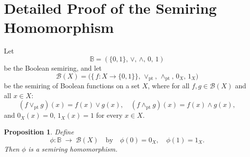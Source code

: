 \documentclass{article}
\newtheorem{proposition}{Proposition}
\begin{document}
\section*{Detailed Proof of the Semiring Homomorphism}

Let
\[
  \mathbb{B} = (\{0,1\},\,\vee,\,\wedge,\,0,\,1)
\]
be the Boolean semiring, and let
\[
  \mathcal{B}(X) = \bigl(\{\,f:X\to\{0,1\}\},\,\vee_{\mathrm{pt}},\,\wedge_{\mathrm{pt}},\,0_X,\,1_X\bigr)
\]
be the semiring of Boolean functions on a set $X$, where for all $f,g\in\mathcal{B}(X)$ and all $x\in X$:
\[
  (f\vee_{\mathrm{pt}} g)(x) = f(x)\vee g(x),
  \quad
  (f\wedge_{\mathrm{pt}} g)(x) = f(x)\wedge g(x),
\]
and $0_X(x)=0$, $1_X(x)=1$ for every $x\in X$.

\begin{proposition}
Define
\[
  \phi : \mathbb{B} \;\longrightarrow\; \mathcal{B}(X)
  \quad\text{by}\quad
  \phi(0) = 0_X,
  \quad
  \phi(1) = 1_X.
\]
Then $\phi$ is a semiring homomorphism.
\end{proposition}
\end{document}
